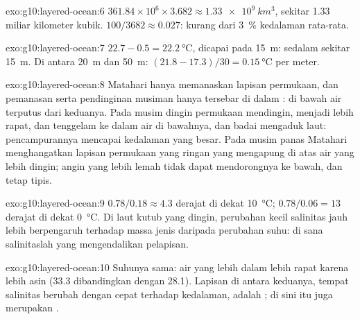 \begin{solution}{exo:g10:layered-ocean:6}
$361.84\times10^6 \times 3.682 \approx \qty{1.33e9}{km^3}$, sekitar
\num{1.33} miliar kilometer kubik. $100/3682 \approx 0.027$: kurang dari
\qty{3}{\percent} kedalaman rata-rata.
\end{solution}

\begin{solution}{exo:g10:layered-ocean:7}
$22.7 - 0.5 = \qty{22.2}{\degreeCelsius}$, dicapai pada \qty{15}{m}:  sedalam sekitar \qty{15}{m}. Di antara \qty{20}{m} dan \qty{50}{m}:
$(21.8 - 17.3)/30 = \qty{0.15}{\degreeCelsius}$ per meter.
\end{solution}

\begin{solution}{exo:g10:layered-ocean:8}
Matahari hanya memanaskan lapisan permukaan, dan pemanasan serta pendinginan
musiman hanya tersebar di dalam : di bawah  air
terputus dari keduanya. Pada musim dingin permukaan mendingin, menjadi lebih
rapat, dan tenggelam ke dalam air di bawahnya, dan badai mengaduk laut:
pencampurannya mencapai kedalaman yang besar. Pada musim panas Matahari
menghangatkan lapisan permukaan yang ringan yang mengapung di atas air yang
lebih dingin; angin yang lebih lemah tidak dapat mendorongnya ke bawah, dan
 tetap tipis.
\end{solution}

\begin{solution}{exo:g10:layered-ocean:9}
$0.78/0.18 \approx 4.3$ derajat di dekat \qty{10}{\degreeCelsius};
$0.78/0.06 = 13$ derajat di dekat \qty{0}{\degreeCelsius}. Di laut kutub yang
dingin, perubahan kecil salinitas jauh lebih berpengaruh terhadap massa jenis
daripada perubahan suhu: di sana salinitaslah yang mengendalikan pelapisan.
\end{solution}

\begin{solution}{exo:g10:layered-ocean:10}
Suhunya sama: air yang lebih dalam lebih rapat karena lebih asin (33.3
dibandingkan dengan 28.1). Lapisan di antara keduanya, tempat salinitas
berubah dengan cepat terhadap kedalaman, adalah ; di sini  itu
juga merupakan .
\end{solution}

